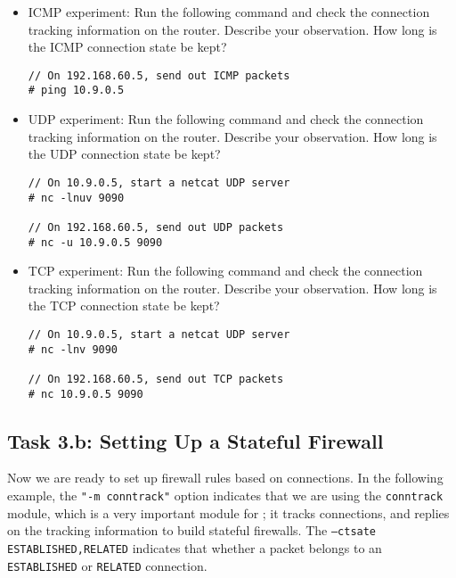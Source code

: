 \begin{itemize}
\item ICMP experiment: Run the following command and 
check the connection tracking information on the router. Describe
your observation. How long is the ICMP connection state be kept? 

\begin{lstlisting}
// On 192.168.60.5, send out ICMP packets
# ping 10.9.0.5
\end{lstlisting}

\item UDP experiment: Run the following command and 
check the connection tracking information on the router. Describe
your observation. How long is the UDP connection state be kept? 


\begin{lstlisting}
// On 10.9.0.5, start a netcat UDP server
# nc -lnuv 9090

// On 192.168.60.5, send out UDP packets 
# nc -u 10.9.0.5 9090
\end{lstlisting}


\item TCP experiment: Run the following command and 
check the connection tracking information on the router. Describe
your observation. How long is the TCP connection state be kept? 

\begin{lstlisting}
// On 10.9.0.5, start a netcat UDP server
# nc -lnv 9090

// On 192.168.60.5, send out TCP packets 
# nc 10.9.0.5 9090
\end{lstlisting}

\end{itemize}
 


\subsection{Task 3.b: Setting Up a Stateful Firewall} 


Now we are ready to set up firewall rules based on connections. 
In the following example, 
the \texttt{"-m conntrack"} option indicates that we are using the \texttt{conntrack} module,
which is a very important module for \iptables; it tracks connections, and
\iptables replies on the tracking information to build stateful firewalls. 
The \texttt{--ctsate ESTABLISHED,RELATED} indicates that whether a packet
belongs to an \texttt{ESTABLISHED} or \texttt{RELATED} connection.

